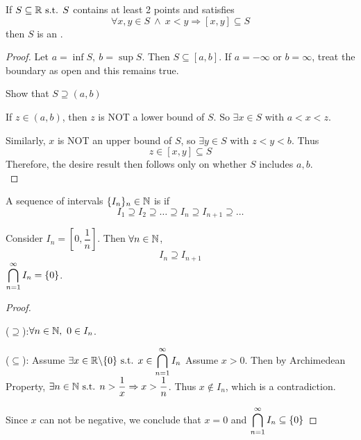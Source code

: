 \documentclass[a4paper,12pt]{article}
\begin{document}
\begin{theorem}
    If \(S\subseteq\mathbb{R}\text{ s.t. } S\) contains at least 2 points and satisfies
    \[\forall x,y\in S \ \wedge\ x<y\Rightarrow[x,y]\subseteq S\]
    then \(S\) is an .
    \begin{proof}
        Let \(a=\inf S,\ b=\sup S\). Then \(S\subseteq[a,b]\).
        If \(a=-\infty\) or \(b=\infty\), treat the boundary as open and this remains true.

         Show that \(S\supseteq(a,b)\)

        If \(z\in(a,b)\), then \(z\) is NOT a lower bound of \(S\). So \(\exists x\in S\) with \(a<x<z\). 
        
        Similarly, \(x\) is NOT an upper bound of \(S\), so \(\exists y\in S\) with \(z<y<b\). Thus
        \[z\in[x,y]\subseteq S\]
        Therefore, the desire result then follows only on whether \(S\) includes \(a,b\).\\
    \end{proof}
\end{theorem}

\begin{definition}
    A sequence of intervals \(\displaystyle\{I_n\}_n\in\mathbb{N}\) is  if 
    \[I_1\supseteq I_2\supseteq\dots\supseteq I_n\supseteq I_{n+1}\supseteq\dots\]
\end{definition}

\begin{example}
    Consider \(I_n=[0,\dfrac{1 }{n }]\). Then \(\forall n\in\mathbb{N}\), 
    \[I_n\supseteq I_{n+1}\]
     \(\displaystyle\bigcap_{n=1}^{\infty}I_n=\{0\}\).
    \begin{proof}\ 

        (\(\supseteq\)):\(\forall n\in\mathbb{N},\ 0\in I_n\).

        (\(\subseteq\)): Assume \(\exists x\in\mathbb{R}\backslash\{0\}\text{ s.t. } x\in\displaystyle\bigcap_{n=1}^{\infty}I_n\)
        Assume \(x>0\). Then by Archimedean Property, \(\exists n\in\mathbb{N}\text{ s.t. } n>\dfrac{1 }{x}\Rightarrow x>\dfrac{1 }{n}\). Thus \(x\notin I_n\), which is a contradiction. 
        
        Since \(x\) can not be negative, we conclude that \(x=0\) and \(\displaystyle\bigcap_{n=1}^{\infty}I_n\subseteq\{0\}\) 
    \end{proof}
\end{example}

\newpage
\end{document}
